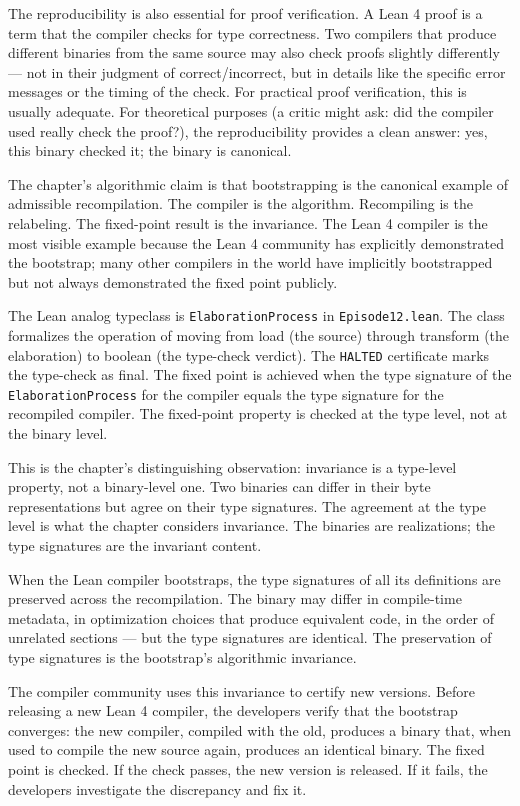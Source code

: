 The reproducibility is also essential for proof verification.
A Lean 4 proof is a term that the compiler checks for type
correctness. Two compilers that produce different binaries from
the same source may also check proofs slightly differently --- not
in their judgment of correct/incorrect, but in details like the
specific error messages or the timing of the check. For practical
proof verification, this is usually adequate. For theoretical
purposes (a critic might ask: did the compiler used really check
the proof?), the reproducibility provides a clean answer:
yes, this binary checked it; the binary is canonical.

The chapter's algorithmic claim is that bootstrapping is the
canonical example of admissible recompilation. The compiler is
the algorithm. Recompiling is the relabeling. The fixed-point
result is the invariance. The Lean 4 compiler is the most
visible example because the Lean 4 community has explicitly
demonstrated the bootstrap; many other compilers in the world
have implicitly bootstrapped but not always demonstrated the
fixed point publicly.

The Lean analog typeclass is \texttt{ElaborationProcess} in
\texttt{Episode12.lean}. The class formalizes the operation of
moving from load (the source) through transform (the
elaboration) to boolean (the type-check verdict). The
\texttt{HALTED} certificate marks the type-check as final. The
fixed point is achieved when the type signature of the
\texttt{ElaborationProcess} for the compiler equals the type
signature for the recompiled compiler. The fixed-point property
is checked at the type level, not at the binary level.

This is the chapter's distinguishing observation: invariance is
a type-level property, not a binary-level one. Two binaries can
differ in their byte representations but agree on their type
signatures. The agreement at the type level is what the chapter
considers invariance. The binaries are realizations; the type
signatures are the invariant content.

When the Lean compiler bootstraps, the type signatures of all
its definitions are preserved across the recompilation. The
binary may differ in compile-time metadata, in optimization
choices that produce equivalent code, in the order of unrelated
sections --- but the type signatures are identical. The
preservation of type signatures is the bootstrap's algorithmic
invariance.

The compiler community uses this invariance to certify new
versions. Before releasing a new Lean 4 compiler, the
developers verify that the bootstrap converges: the new compiler,
compiled with the old, produces a binary that, when used to
compile the new source again, produces an identical binary. The
fixed point is checked. If the check passes, the new version is
released. If it fails, the developers investigate the
discrepancy and fix it.

